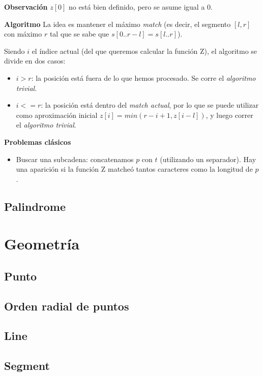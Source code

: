 \textbf{Observación}
$z[0]$ no está bien definido, pero se asume igual a $0$.

\textbf{Algoritmo}
La idea es mantener el máximo \emph{match} (es decir, el segmento $[l, r]$ con
máximo $r$ tal que se sabe que $s[0..r-l] = s[l..r]$). 

Siendo $i$ el índice actual (del que queremos calcular la función Z), el algoritmo 
se divide en dos casos:
\begin{itemize}
    \item $i > r$: la posición está fuera de lo que hemos procesado. Se corre el
    \emph{algoritmo trivial}.
    \item $i <= r$: la posición está dentro del \emph{match actual}, por lo que
    se puede utilizar como aproximación inicial $z[i] = min(r - i + 1, z[i-l])$,
    y luego correr el \emph{algoritmo trivial}.
\end{itemize}

\textbf{Problemas clásicos}
\begin{itemize}
    \item Buscar una subcadena: concatenamos $p$ con $t$ (utilizando un separador).
    Hay una aparición si la función Z matcheó tantos caracteres como la longitud
    de $p$.
\end{itemize}
\subsection{Palindrome}

\section{Geometría}%
\subsection{Punto}
\subsection{Orden radial de puntos}
\subsection{Line}
\subsection{Segment}
